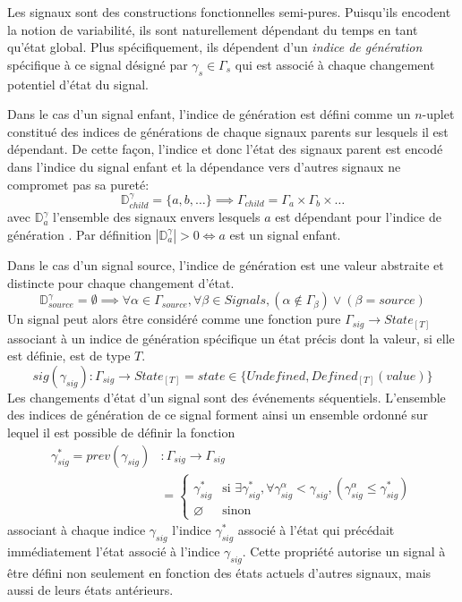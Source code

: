 	Les signaux sont des constructions fonctionnelles semi-pures. Puisqu'ils encodent la notion de variabilité, ils sont naturellement dépendant du temps en tant qu'état global. Plus spécifiquement, ils dépendent d'un \emph{indice de génération} spécifique à ce signal désigné par $\gamma_s \in \Gamma_s$ qui est associé à chaque changement potentiel d'état du signal.
	
	Dans le cas d'un signal enfant, l'indice de génération est défini comme un $n$-uplet constitué des indices de générations de chaque signaux parents sur lesquels il est dépendant. De cette façon, l'indice et donc l'état des signaux parent est encodé dans l'indice du signal enfant et la dépendance vers d'autres signaux ne compromet pas sa pureté:
	\[
		\mathbb{D}^\gamma_{child} = \{ a, b, \dots \} \implies \Gamma_{child} = \Gamma_a \times \Gamma_b \times \dots
	\]
	avec $\mathbb{D}^\gamma_{a}$ l'ensemble des signaux envers lesquels $a$ est dépendant pour l'indice de génération \gamma. Par définition $|\mathbb{D}^\gamma_{a}| > 0 \iff a$ est un signal enfant.
	
	Dans le cas d'un signal source, l'indice de génération est une valeur abstraite et distincte pour chaque changement d'état.
	\[
		\mathbb{D}^\gamma_{source} = \emptyset \implies \forall \alpha \in \Gamma_{source}, \forall \beta \in Signals, (\alpha \notin \Gamma_\beta) \lor (\beta = source)
	\]
	Un signal peut alors être considéré comme une fonction pure $\Gamma_{sig} \to State_{[T]}$ associant à un indice de génération spécifique un état précis dont la valeur, si elle est définie, est de type $T$.
	\[
		sig(\gamma_{sig})\colon \Gamma_{sig} \to State_{[T]} = state \in \{ Undefined, Defined_{[T]}(value) \}
	\]
	Les changements d'état d'un signal sont des événements séquentiels. L'ensemble des indices de génération de ce signal forment ainsi un ensemble ordonné sur lequel il est possible de définir la fonction
	\begin{align*}
		\gamma^*_{sig} = prev(\gamma_{sig}) &\colon \Gamma_{sig} \to \Gamma_{sig}\\
		& = \begin{cases}
			\gamma^*_{sig} & \text{si }
				 \exists \gamma^*_{sig}, \forall \gamma^\alpha_{sig} < \gamma_{sig}, (\gamma^\alpha_{sig} \leq \gamma^*_{sig})\\
			\varnothing & \text{sinon}
		\end{cases}
	\end{align*}
	associant à chaque indice $\gamma_{sig}$ l'indice $\gamma^*_{sig}$ associé à l'état qui précédait immédiatement l'état associé à l'indice $\gamma_{sig}$. Cette propriété autorise un signal à être défini non seulement en fonction des états actuels d'autres signaux, mais aussi de leurs états antérieurs.
	
